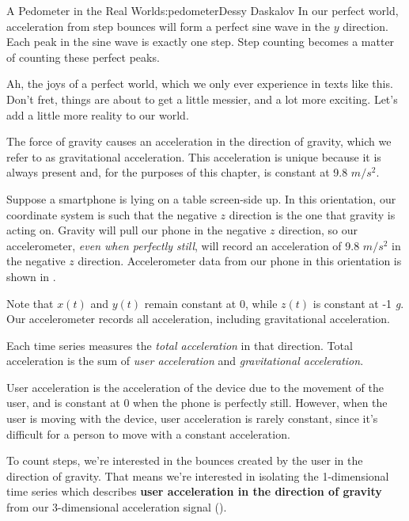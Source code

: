 \begin{aosachapter}{A Pedometer in the Real World}{s:pedometer}{Dessy Daskalov}
In our perfect world, acceleration from step bounces will form a perfect
sine wave in the $y$ direction. Each peak in the sine wave is exactly
one step. Step counting becomes a matter of counting these perfect
peaks.

Ah, the joys of a perfect world, which we only ever experience in texts
like this. Don't fret, things are about to get a little messier, and a
lot more exciting. Let's add a little more reality to our world.

\label{even-perfect-worlds-have-fundamental-forces-of-nature}

The force of gravity causes an acceleration in the direction of gravity,
which we refer to as gravitational acceleration. This acceleration is
unique because it is always present and, for the purposes of this
chapter, is constant at 9.8 $m/s^2$.

Suppose a smartphone is lying on a table screen-side up. In this
orientation, our coordinate system is such that the negative $z$
direction is the one that gravity is acting on. Gravity will pull our
phone in the negative $z$ direction, so our accelerometer, \emph{even
when perfectly still}, will record an acceleration of 9.8 $m/s^2$ in the
negative $z$ direction. Accelerometer data from our phone in this
orientation is shown in
.


Note that $x(t)$ and $y(t)$ remain constant at 0, while $z(t)$ is
constant at -1 \emph{g}. Our accelerometer records all acceleration,
including gravitational acceleration.

Each time series measures the \emph{total acceleration} in that
direction. Total acceleration is the sum of \emph{user acceleration} and
\emph{gravitational acceleration}.

User acceleration is the acceleration of the device due to the movement
of the user, and is constant at 0 when the phone is perfectly still.
However, when the user is moving with the device, user acceleration is
rarely constant, since it's difficult for a person to move with a
constant acceleration.


To count steps, we're interested in the bounces created by the user in
the direction of gravity. That means we're interested in isolating the
1-dimensional time series which describes \textbf{user acceleration in
the direction of gravity} from our 3-dimensional acceleration signal
().


\end{aosachapter}
